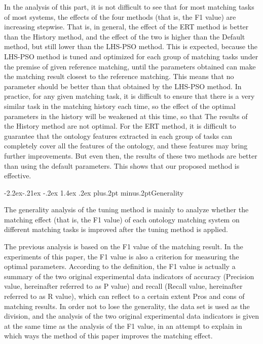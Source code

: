 \documentclass[twoside]{article}
\makeatletter
\def\subsubsection{\@startsection{subsubsection}{3}{\z@}%
 {-2.2ex\@plus -.21ex \@minus -.2ex}%
 {1.4ex \@plus.2ex}
{\normalfont\normalsize\protect\baselineskip=12pt plus.2pt minus.2pt\sl}}
\makeatother
\begin{document}
\begin{multicols}{2}
In the analysis of this part, it is not difficult to see that for most matching tasks of most systems, the effects of the four methods (that is, the F1 value) are increasing stepwise. 
That is, in general, the effect of the ERT method is better than the History method, and the effect of the two is higher than the Default method, but still lower than the LHS-PSO method. 
This is expected, because the LHS-PSO method is tuned and optimized for each group of matching tasks under the premise of given reference matching, until the parameters obtained can make the matching result closest to the reference matching. 
This means that no parameter should be better than that obtained by the LHS-PSO method. 
In practice, for any given matching task, it is difficult to ensure that there is a very similar task in the matching history each time, so the effect of the optimal parameters in the history will be weakened at this time, so that The results of the History method are not optimal. 
For the ERT method, it is difficult to guarantee that the ontology features extracted in each group of tasks can completely cover all the features of the ontology, and these features may bring further improvements. 
But even then, the results of these two methods are better than using the default parameters. 
This shows that our proposed method is effective.

\subsubsection{Generality}

The generality analysis of the tuning method is mainly to analyze whether the matching effect (that is, the F1 value) of each ontology matching system on different matching tasks is improved after the tuning method is applied.

The previous analysis is based on the F1 value of the matching result. In the experiments of this paper, the F1 value is also a criterion for measuring the optimal parameters. 
According to the definition, the F1 value is actually a summary of the two original experimental data indicators of accuracy (Precision value, hereinafter referred to as P value) and recall (Recall value, hereinafter referred to as R value), which can reflect to a certain extent Pros and cons of matching results. 
In order not to lose the generality, the data set is used as the division, and the analysis of the two original experimental data indicators is given at the same time as the analysis of the F1 value, in an attempt to explain in which ways the method of this paper improves the matching effect.


\end{multicols}
\end{document}
